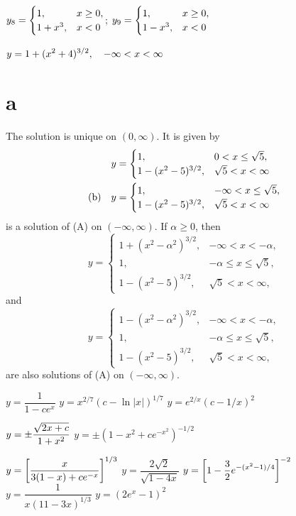 $y_8=\displaystyle{\begin{cases}1,&x\ge 0,\\
1+x^3,&x<0\end{cases}}$;  \quad
$y_9=\displaystyle{\begin{cases}1,&x\ge 0,\\
1-x^3,&x<0\end{cases}}$

$\displaystyle{y=1+(x^2+4)^{3/2}, \quad - \infty < x < \infty}$

 \part{a}
 The solution is unique on $(0,\infty)$. It is given by
\begin{align*}
y&=
\begin{cases}
1, & 0< x\le\sqrt5,\\
1-(x^2-5)^{3/2}, & \sqrt5<x<\infty
\end{cases}
\\
\text{(b)}\quad\displaystyle y&= \begin{cases}
 1, &-\infty< x\le\sqrt5,\\
1-(x^2-5)^{3/2},& \sqrt5<x<\infty
\end{cases}
\end{align*}
is a solution of (A) on $(-\infty,\infty)$. If $\alpha\ge0$,
then
\[
y= \begin{cases}
 1+(x^2-\alpha^2)^{3/2},& -\infty<x<-\alpha, \\
1, & -\alpha\le x\le\sqrt5,\\
1-(x^2-5)^{3/2},& \sqrt5<x<\infty,
\end{cases}\]
and
\[
y= \begin{cases}
 1-(x^2-\alpha^2)^{3/2},& -\infty<x<-\alpha, \\
1, & -\alpha\le x\le\sqrt5,\\
1-(x^2-5)^{3/2},& \sqrt5<x<\infty,
\end{cases}\]
are also solutions of (A)  on $(-\infty,\infty)$.



 $y=\dfrac{1}{1-ce^x}$
 $y=x^{2/7}(c-\ln|x|)^{1/7}$
 $y=e^{2/x}(c-1/x)^2$

 $y=\pm\displaystyle{\frac{\sqrt{2x+c}}{1+x^2}}$
 $y=\pm(1-x^2+ce^{-x^2})^{-1/2}$

 $y=\displaystyle{\left[\frac{x}{3(1-x)+ce^{-x}}\right]^{1/3}}$
 $y=\dfrac{2\sqrt2}{\sqrt{1-4x}}$
$y=\displaystyle{\left[1-\frac{3}{2}e^{-(x^2-1)/4}\right]^{-2}}$
 $y=\dfrac{1}{x(11-3x)^{1/3}}$
 $y=(2e^x-1)^2$

